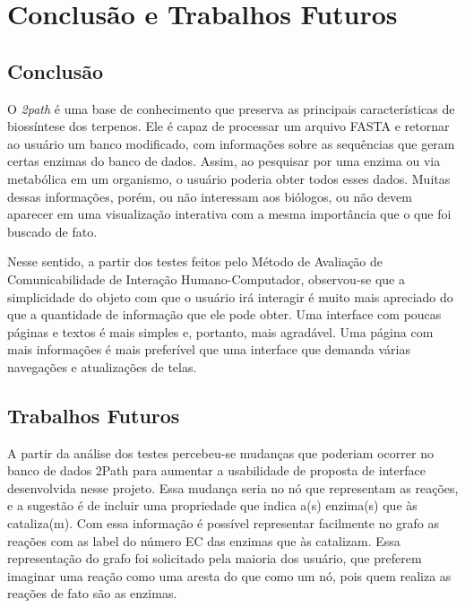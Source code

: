 \chapter{Conclusão e Trabalhos Futuros}

\section*{Conclusão}

\indent O \textit{2path} é uma base de conhecimento que preserva as principais características de biossíntese dos terpenos. Ele é capaz de processar um arquivo FASTA e retornar ao usuário um banco modificado, com informações sobre as sequências que geram certas enzimas do banco de dados. Assim, ao pesquisar por uma enzima ou via metabólica em um organismo, o usuário poderia obter todos esses dados. Muitas dessas informações, porém, ou não interessam aos biólogos, ou não devem aparecer em uma visualização interativa com a mesma importância que o que foi buscado de fato.

\indent Nesse sentido, a partir dos testes feitos pelo Método de Avaliação de Comunicabilidade de Interação Humano-Computador, observou-se que a simplicidade do objeto com que o usuário irá interagir é muito mais apreciado do que a quantidade de informação que ele pode obter. Uma interface com poucas páginas e textos é mais simples e, portanto, mais agradável. Uma página com mais informações é mais preferível que uma interface que demanda várias navegações e atualizações de telas.

\section*{Trabalhos Futuros}

\indent A partir da análise dos testes percebeu-se mudanças que poderiam ocorrer no banco de dados 2Path para aumentar a usabilidade de proposta de interface desenvolvida nesse projeto. Essa mudança seria no nó que representam as reações, e a sugestão é de incluir uma propriedade que indica a(s) enzima(s) que às cataliza(m). Com essa informação é possível representar facilmente no grafo as reações com as label do número EC das enzimas que às catalizam. Essa representação do grafo foi solicitado pela maioria dos usuário, que preferem imaginar uma reação como uma aresta do que como um nó, pois quem realiza as reações de fato são as enzimas.